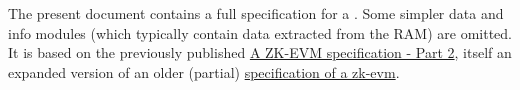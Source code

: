 The present document contains a full specification for a \zkEvm{}. Some simpler data and info modules (which typically contain data extracted from the RAM) are omitted. It is based on the previously published \href{https://ethresear.ch/t/a-zk-evm-specification-part-2/13903}{A ZK-EVM specification - Part 2}, itself an expanded version of an older (partial) \href{https://ethresear.ch/t/a-zk-evm-specification/11549}{specification of a zk-evm}.
